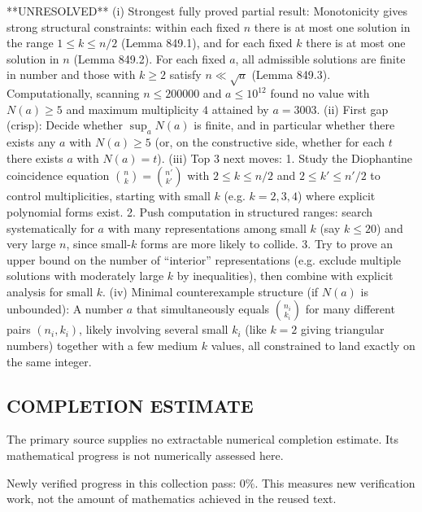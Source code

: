 **UNRESOLVED**
(i) Strongest fully proved partial result: Monotonicity gives strong structural constraints: within each fixed $n$ there is at most one solution in the range $1\le k\le n/2$ (Lemma 849.1), and for each fixed $k$ there is at most one solution in $n$ (Lemma 849.2). For each fixed $a$, all admissible solutions are finite in number and those with $k\ge 2$ satisfy $n\ll \sqrt{a}$ (Lemma 849.3). Computationally, scanning $n\le 200000$ and $a\le 10^{12}$ found no value with $N(a)\ge 5$ and maximum multiplicity $4$ attained by $a=3003$.
(ii) First gap (crisp): Decide whether $\sup_a N(a)$ is finite, and in particular whether there exists any $a$ with $N(a)\ge 5$ (or, on the constructive side, whether for each $t$ there exists $a$ with $N(a)=t$).
(iii) Top 3 next moves:
  1. Study the Diophantine coincidence equation $\binom{n}{k}=\binom{n'}{k'}$ with $2\le k\le n/2$ and $2\le k'\le n'/2$ to control multiplicities, starting with small $k$ (e.g. $k=2,3,4$) where explicit polynomial forms exist.
  2. Push computation in structured ranges: search systematically for $a$ with many representations among small $k$ (say $k\le 20$) and very large $n$, since small-$k$ forms are more likely to collide.
  3. Try to prove an upper bound on the number of “interior” representations (e.g. exclude multiple solutions with moderately large $k$ by inequalities), then combine with explicit analysis for small $k$.
(iv) Minimal counterexample structure (if $N(a)$ is unbounded): A number $a$ that simultaneously equals $\binom{n_i}{k_i}$ for many different pairs $(n_i,k_i)$, likely involving several small $k_i$ (like $k=2$ giving triangular numbers) together with a few medium $k$ values, all constrained to land exactly on the same integer.




\subsection*{COMPLETION ESTIMATE}
The primary source supplies no extractable numerical completion estimate. Its mathematical progress is not numerically assessed here.

Newly verified progress in this collection pass: $0\%$. This measures new verification work, not the amount of mathematics achieved in the reused text.
